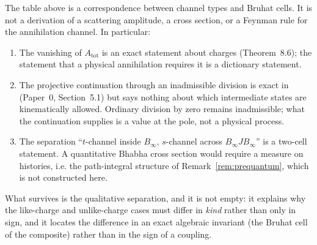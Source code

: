 \begin{warning}
\label{warn:scattering}
The table above is a correspondence between channel types and Bruhat cells.  It
is not a derivation of a scattering amplitude, a cross section, or a Feynman rule
for the annihilation channel.  In particular:
\begin{enumerate}[label=(\alph*)]
  \item The vanishing of $A_{\mathrm{tot}}$ is an exact statement about charges
  (Theorem~8.6); the statement that a physical annihilation requires it is a
  dictionary statement.
  \item The projective continuation through an inadmissible division is exact in
  \AEG{} (Paper~0, Section~5.1) but says nothing about which intermediate states
  are kinematically allowed.  Ordinary division by zero remains inadmissible;
  what the continuation supplies is a value at the pole, not a physical process.
  \item The separation ``$t$-channel inside $B_\infty$, $s$-channel across
  $B_\infty JB_\infty$'' is a two-cell statement.  A quantitative Bhabha cross
  section would require a measure on histories, i.e. the path-integral structure
  of Remark~\ref{rem:prequantum}, which is not constructed here.
\end{enumerate}
\end{warning}

What survives is the qualitative separation, and it is not empty: it explains why
the like-charge and unlike-charge cases must differ in \emph{kind} rather than
only in sign, and it locates the difference in an exact algebraic invariant (the
Bruhat cell of the composite) rather than in the sign of a coupling.
